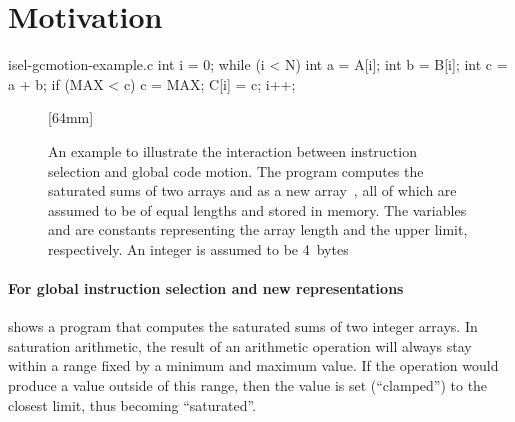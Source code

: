\section{Motivation}

\begin{filecontents*}{isel-gcmotion-example.c}
int i = 0;
while (i < N) {
  int a = A[i];
  int b = B[i];
  int c = a + b;
  if (MAX < c) c = MAX;
  C[i] = c;
  i++;
}
\end{filecontents*}

\begin{figure}
  \centering%
                {}%
  \hspace{5mm}%
                [64mm]%
                {}%

  \caption[%
            An example illustrating the interaction between instruction
            selection and global code motion%
          ]{%
            An example to illustrate the interaction between instruction
            selection and global code motion.
            The program computes the saturated sums of two arrays  and
             as a new array~, all of which are assumed to be
            of equal lengths and stored in memory.
            The variables  and  are constants representing
            the array length and the upper limit, respectively.
            An integer is assumed to be 4~bytes%
          }
\end{figure}

\paragraph{For global instruction selection and new representations}

 shows a program that computes the saturated
sums of two integer arrays.
%
In saturation arithmetic, the result of an arithmetic \gls{operation} will
always stay within a range fixed by a minimum and maximum value.
%
If the \gls{operation} would produce a value outside of this range, then the
value is set (``clamped'') to the closest limit, thus becoming ``saturated''.

